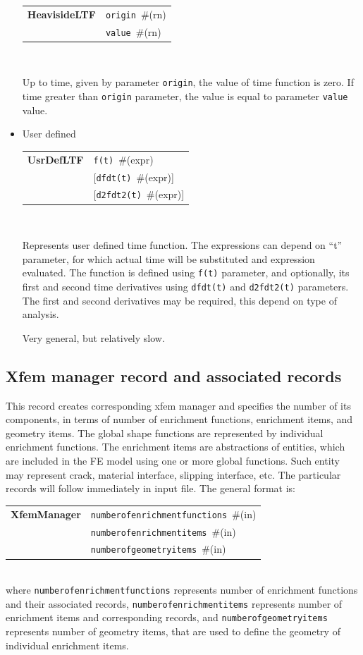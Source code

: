 \documentclass[a4paper]{article}
\makeatletter
\newcommand{\param}[1]{\texttt{#1}} %
\newcommand{\optional}[1]{[#1]} %
\newcommand{\field}[2]{\param{#1}~\#{\tiny(#2)}} %
\newcommand{\optField}[2]{\optional{\field{#1}{#2}}}
\newcommand{\entKeywordInst}[1]{\textbf{#1}} %
\newenvironment{record}[1][]{\begin{tabular}{|ll}}{\end{tabular}\\}
\newcommand{\recentry}[2]{{#1}&{#2}\\}
\newcounter{rcc}
\newenvironment{record}[1][\textwidth]{\setcounter{rcc}{0}\begin{tabular*}{#1}{|ll@{\extracolsep{\fill}}r}}{\end{tabular*}\\}
\newcommand{\recentry}[2]{\ifthenelse{\value{rcc}>0}{&$\backslash$ \\}{\setcounter{rcc}{1}}{#1}&{#2}}
\makeatother
\begin{document}
\begin{itemize}
\begin{record}[0.9\textwidth]
  \recentry{\entKeywordInst{HeavisideLTF}}{\field{origin}{rn}}
  \recentry{}{\field{value}{rn}}
\end{record}

Up to time, given by
parameter \param{origin}, the value of time function is zero. If time
greater than \param{origin} parameter, the value is
equal to parameter \param{value} value.
\item User defined

\begin{record}[0.9\textwidth]
  \recentry{\entKeywordInst{UsrDefLTF}}{\field{f(t)}{expr}}
  \recentry{}{\optField{dfdt(t)}{expr}}
  \recentry{}{\optField{d2fdt2(t)}{expr}}
\end{record}

Represents user defined time function.
The expressions can depend on ``t'' parameter, for which actual time will be substituted and
expression evaluated. The function is defined using \param{f(t)} parameter, and optionally, its first and second time derivatives using \param{dfdt(t)} and \param{d2fdt2(t)} parameters.
The first and second derivatives may be required, this depend on type of analysis.

Very general, but relatively slow.
\end{itemize}

\subsection{Xfem manager record and associated records}
\label{_XFEMManagerRecords}
This record creates corresponding xfem manager and specifies the number of its components, in terms of number of enrichment functions, enrichment items, and geometry items. The global shape functions are represented by  individual enrichment functions. The enrichment items are abstractions of entities, which are included in the FE model using one or more global functions. Such entity may represent crack, material interface, slipping interface, etc. The particular records will follow immediately in input file. The general format is:\\
\begin{record}
  \recentry{\entKeywordInst{XfemManager}}{\field{numberofenrichmentfunctions}{in}}
  \recentry{}{\field{numberofenrichmentitems}{in}}
  \recentry{}{\field{numberofgeometryitems}{in}}
\end{record}
where \param{numberofenrichmentfunctions} represents number of enrichment functions and their associated records, \param{numberofenrichmentitems}
represents number of enrichment items and corresponding records, and \param{number\-of\-geometry\-items} represents number of geometry items, that are used to define the geometry of individual enrichment items.
\end{document}
